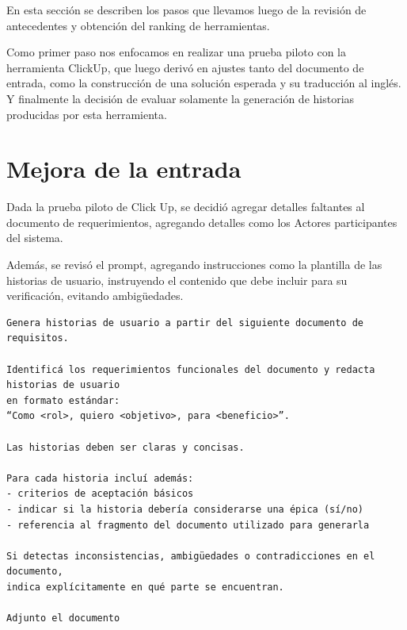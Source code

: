 
En esta sección se describen los pasos que llevamos luego de la revisión de antecedentes y obtención del ranking de herramientas.

Como primer paso nos enfocamos en realizar una prueba piloto con la herramienta ClickUp, que luego derivó en ajustes tanto del documento de entrada, como la construcción de una solución esperada y su traducción al inglés. Y finalmente la decisión de evaluar solamente la generación de historias producidas por esta herramienta.



\section{Mejora de la entrada}

Dada la prueba piloto de Click Up, se decidió agregar detalles faltantes al documento de requerimientos, agregando detalles como los Actores participantes del sistema.

Además, se revisó el prompt, agregando instrucciones como la plantilla de las historias de usuario, instruyendo el contenido que debe incluir para su verificación, evitando ambigüedades.

\begin{verbatim}
Genera historias de usuario a partir del siguiente documento de requisitos.

Identificá los requerimientos funcionales del documento y redacta historias de usuario
en formato estándar:
“Como <rol>, quiero <objetivo>, para <beneficio>”.

Las historias deben ser claras y concisas.

Para cada historia incluí además:
- criterios de aceptación básicos
- indicar si la historia debería considerarse una épica (sí/no)
- referencia al fragmento del documento utilizado para generarla

Si detectas inconsistencias, ambigüedades o contradicciones en el documento,
indica explícitamente en qué parte se encuentran.

Adjunto el documento
\end{verbatim}

